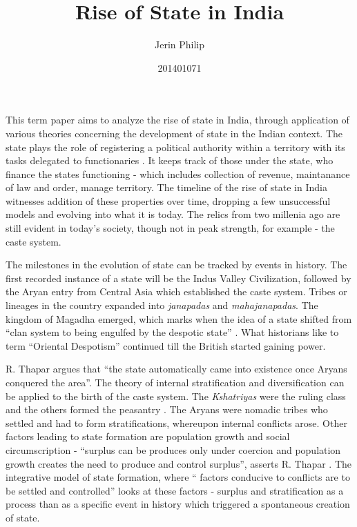 \documentclass[a4paper]{article}
\title{Rise of State in India}
\author{Jerin Philip}
\date{201401071}
\begin{document}
\maketitle
This term paper aims to analyze the rise of state in India, through
application of various theories concerning the development of state in
the Indian context.  
The state plays the role of registering a political authority within a
territory with its tasks delegated to functionaries \cite[p.
11]{thapar1984lineage}. It keeps track of \cite[p.
12-13]{thapar1984lineage} those under the state, who finance the states
functioning - which includes collection of revenue, maintanance of law
and order, manage territory. The timeline of the rise of state in India
witnesses addition of these properties over time, dropping a few
unsuccessful models and evolving into what it is today. The relics from
two millenia ago are still evident in today's society, though not in
peak strength, for example - the caste system.

The milestones in the evolution of state can be tracked by events in
history.  The first recorded instance of a state will be the Indus
Valley Civilization, followed by the Aryan entry from Central Asia which
established the caste system. Tribes or lineages in the country expanded
into \textit{janapadas} and \textit{mahajanapadas}. The kingdom of
Magadha emerged, which marks when the idea of a state shifted from
``clan system to being engulfed by the despotic state'' \cite[p.
5]{thapar1984lineage}. What historians like to term ``Oriental
Despotism'' continued till the British started gaining power. 

R. Thapar argues \cite[p.4]{thapar1984lineage} that ``the state
automatically came into existence once Aryans conquered the area''. The
theory of internal stratification and diversification can be applied to
the birth of the caste system. The \textit{Kshatriyas} were the ruling
class and the others formed the peasantry \cite[p.
4]{thapar1984lineage}. The Aryans were nomadic tribes who settled and
had to form stratifications, whereupon internal conflicts arose. Other
factors leading to state formation are population growth and social
circumscription - ``surplus can be produces only under coercion and
population growth creates the need to produce and control surplus'',
asserts R. Thapar \cite[p. 8]{thapar1984lineage}. The integrative
model of state formation, where `` factors conducive to conflicts are
to be settled and controlled'' \cite[p. 8]{thapar1984lineage} looks at
these factors - surplus and stratification as a process than as a
specific event in history which triggered a spontaneous creation of
state. 
\end{document}
